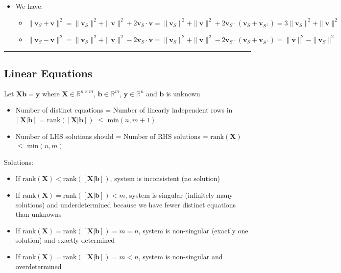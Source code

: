 \begin{itemize}
\begin{itemize}
\begin{itemize}
        \end{itemize}
    \end{itemize}
    \item We have:
    \begin{itemize}
        \item $\| \boldsymbol{v}_S + \boldsymbol{v} \|^2 = \|\boldsymbol{v}_S\|^2 + \|\boldsymbol{v}\|^2 + 2\boldsymbol{v}_S \cdot \boldsymbol{v} = \|\boldsymbol{v}_S\|^2 + \|\boldsymbol{v}\|^2 + 2 \boldsymbol{v}_S \cdot (\boldsymbol{v}_S + \boldsymbol{v}_{S^\bot}) = 3\|\boldsymbol{v}_S\|^2 + \|\boldsymbol{v}\|^2$
        \item $\| \boldsymbol{v}_S - \boldsymbol{v} \|^2 = \|\boldsymbol{v}_S\|^2 + \|\boldsymbol{v}\|^2 - 2\boldsymbol{v}_S \cdot \boldsymbol{v} = \|\boldsymbol{v}_S\|^2 + \|\boldsymbol{v}\|^2 - 2 \boldsymbol{v}_S \cdot (\boldsymbol{v}_S + \boldsymbol{v}_{S^\bot}) =  \|\boldsymbol{v}\|^2 -\|\boldsymbol{v}_S\|^2$
    \end{itemize}
\end{itemize}

{\color{black}\hrule height 0.001mm}

\subsection*{Linear Equations}
Let $\boldsymbol{X}\boldsymbol{b} = \boldsymbol{y}$ where $\boldsymbol{X} \in \mathbb{R}^{n \times m}$, $\boldsymbol{b} \in \mathbb{R}^{m}$, $\boldsymbol{y} \in \mathbb{R}^{n}$ and $\boldsymbol{b}$ is unknown
\begin{itemize}
    \item Number of distinct equations = Number of linearly independent rows in $[\boldsymbol{X} | \boldsymbol{b}]$ = $\textrm{rank}([\boldsymbol{X} | \boldsymbol{b}])$ $\leq$ $\textrm{min}(n,m+1)$
    \item Number of LHS solutions should = Number of RHS solutions = $\textrm{rank}(\boldsymbol{X})$ $\leq$ $\textrm{min}(n,m)$
\end{itemize}
Solutions:
\begin{itemize}
    \item If $\textrm{rank}(\boldsymbol{X}) < \textrm{rank}([\boldsymbol{X} | \boldsymbol{b}])$, system is inconsistent (no solution)
    \item If $\textrm{rank}(\boldsymbol{X}) = \textrm{rank}([\boldsymbol{X} | \boldsymbol{b}]) < m$, system is singular  (infinitely many solutions) and underdetermined because we have fewer distinct equations than unknowns
    \item If $\textrm{rank}(\boldsymbol{X}) = \textrm{rank}([\boldsymbol{X} | \boldsymbol{b}]) = m = n$, system is non-singular (exactly one solution) and exactly determined 
    \item If $\textrm{rank}(\boldsymbol{X}) = \textrm{rank}([\boldsymbol{X} | \boldsymbol{b}]) = m < n$, system is non-singular and overdetermined 
\end{itemize}

